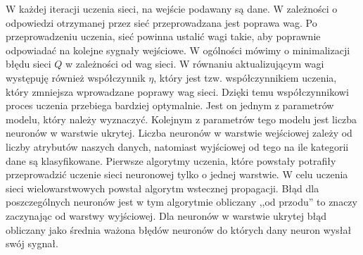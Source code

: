 
W każdej iteracji uczenia sieci, na wejście podawany są dane. W zależności o odpowiedzi otrzymanej przez sieć przeprowadzana jest poprawa wag. Po przeprowadzeniu uczenia, sieć powinna ustalić wagi takie, aby poprawnie odpowiadać na kolejne sygnały wejściowe. W ogólności mówimy o minimalizacji błędu sieci $Q$ w zależności od wag sieci. W równaniu aktualizującym wagi występuję również współczynnik $\eta$, który jest tzw. współczynnikiem uczenia, który zmniejsza wprowadzane poprawy wag sieci. Dzięki temu współczynnikowi proces uczenia przebiega bardziej optymalnie. Jest on jednym z parametrów modelu, który należy wyznaczyć. Kolejnym z parametrów tego modelu jest liczba neuronów w warstwie ukrytej. Liczba neuronów w warstwie wejściowej zależy od liczby atrybutów naszych danych, natomiast wyjściowej od tego na ile kategorii dane są klasyfikowane. Pierwsze algorytmy uczenia, które powstały potrafiły przeprowadzić uczenie sieci neuronowej tylko o jednej warstwie. W celu uczenia sieci wielowarstwowych powstał algorytm wstecznej propagacji. Błąd dla poszczególnych neuronów jest w tym algorytmie obliczany ,,od przodu'' to znaczy zaczynając od warstwy wyjściowej. Dla neuronów w warstwie ukrytej błąd obliczany jako średnia ważona błędów neuronów do których dany neuron wysłał swój sygnał.
